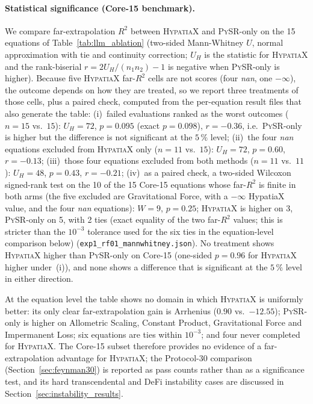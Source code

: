 \documentclass[twoside,11pt]{article}
\newcommand{\Rsq}{R^{2}}
\begin{document}
\paragraph{Statistical significance (Core-15 benchmark).}
We compare far-extrapolation $\Rsq$ between \textsc{HypatiaX} and \textsc{PySR}-only
on the 15 equations of Table~\ref{tab:llm_ablation} (two-sided Mann-Whitney $U$,
normal approximation with tie and continuity correction; $U_H$ is the statistic for
\textsc{HypatiaX} and the rank-biserial $r=2U_H/(n_1n_2)-1$ is negative when
\textsc{PySR}-only is higher). Because five \textsc{HypatiaX} far-$\Rsq$ cells are
not scores (four \textit{nan}, one $-\infty$), the outcome depends on how they are
treated, so we report three treatments of those cells, plus a paired check, computed from the per-equation result
files that also generate the table:
(i)~failed evaluations ranked as the worst outcomes ($n=15$ vs.\ $15$):
$U_H=72$, $p=0.095$ (exact $p=0.098$), $r=-0.36$, i.e.\ \textsc{PySR}-only is higher but the difference is not significant at the $5\,\%$ level;
(ii)~the four \textit{nan} equations excluded from \textsc{HypatiaX} only ($n=11$ vs.\ $15$):
$U_H=72$, $p=0.60$, $r=-0.13$;
(iii)~those four equations excluded from both methods ($n=11$ vs.\ $11$):
$U_H=48$, $p=0.43$, $r=-0.21$;
(iv)~as a paired check, a two-sided Wilcoxon signed-rank test on the 10 of the 15 Core-15 equations whose
far-$\Rsq$ is finite in both arms (the five excluded are Gravitational Force, with a $-\infty$ HypatiaX value, and the four
\textit{nan} equations): $W=9$, $p=0.25$; \textsc{HypatiaX} is higher on 3, \textsc{PySR}-only on 5, with 2 ties
(exact equality of the two far-$\Rsq$ values; this is stricter than the $10^{-3}$ tolerance used for the six ties in the equation-level comparison below) (\texttt{exp1\_rf01\_mannwhitney.json}).
No treatment shows \textsc{HypatiaX} higher than \textsc{PySR}-only on Core-15
(one-sided $p=0.96$ for \textsc{HypatiaX} higher under~(i)), and none shows a difference
that is significant at the $5\,\%$ level in either direction.

At the equation level the table shows no domain in which \textsc{HypatiaX} is
uniformly better: its only clear far-extrapolation gain is Arrhenius ($0.90$ vs.\ $-12.55$);
\textsc{PySR}-only is higher on Allometric Scaling, Constant Product, Gravitational
Force and Impermanent Loss; six equations are ties within $10^{-3}$; and four never completed
for \textsc{HypatiaX}.
The Core-15 subset therefore provides no evidence of a far-extrapolation advantage
for \textsc{HypatiaX}; the Protocol-30 comparison (Section~\ref{sec:feynman30}) is reported as pass counts
rather than as a significance test, and its hard transcendental and DeFi
instability cases are discussed in Section~\ref{sec:instability_results}.
\end{document}
